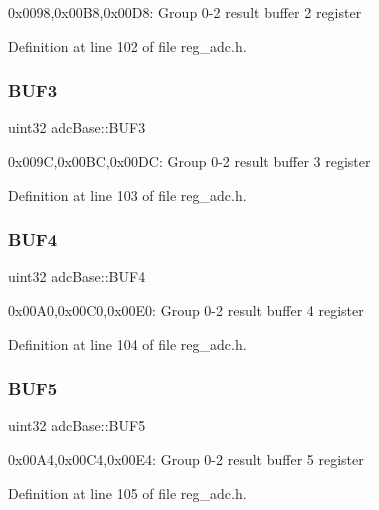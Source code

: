 0x0098,0x00\+B8,0x00\+D8\+: Group 0-\/2 result buffer 2 register 

Definition at line 102 of file reg\+\_\+adc.\+h.

\mbox{\label{structadcBase_ae0c0e966cb8f9b428cdf25d601b9edfb}} 
\subsubsection{\texorpdfstring{B\+U\+F3}{BUF3}}
{\footnotesize\ttfamily uint32 adc\+Base\+::\+B\+U\+F3}

0x009C,0x00\+BC,0x00\+DC\+: Group 0-\/2 result buffer 3 register 

Definition at line 103 of file reg\+\_\+adc.\+h.

\mbox{\label{structadcBase_a54cb862a6ec349279eb3a9c7e1e0404e}} 
\subsubsection{\texorpdfstring{B\+U\+F4}{BUF4}}
{\footnotesize\ttfamily uint32 adc\+Base\+::\+B\+U\+F4}

0x00\+A0,0x00\+C0,0x00\+E0\+: Group 0-\/2 result buffer 4 register 

Definition at line 104 of file reg\+\_\+adc.\+h.

\mbox{\label{structadcBase_aa93848e32e422a324c088ca0e8c74ab5}} 
\subsubsection{\texorpdfstring{B\+U\+F5}{BUF5}}
{\footnotesize\ttfamily uint32 adc\+Base\+::\+B\+U\+F5}

0x00\+A4,0x00\+C4,0x00\+E4\+: Group 0-\/2 result buffer 5 register 

Definition at line 105 of file reg\+\_\+adc.\+h.

\mbox{\label{structadcBase_a29d8751033377855800a4654a90a8095}} 

